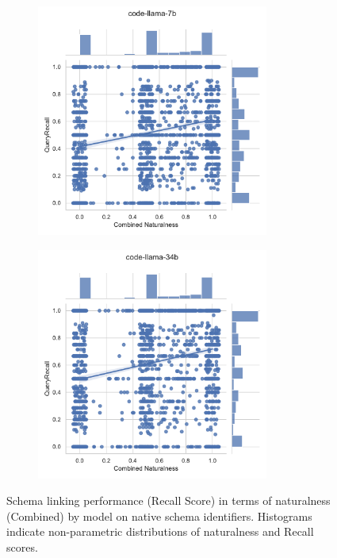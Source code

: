 \begin{figure}
    \begin{subfigure}{.5\textwidth}
      \centering
      \includegraphics[height=3in]{figures/distribution-jointplots/jointplot-code-llama-7b-combined-nat--recall-with-distributions.pdf}
    \end{subfigure}%
    \begin{subfigure}{.5\textwidth}
      \centering
      \includegraphics[height=3in]{figures/distribution-jointplots/jointplot-code-llama-34b-combined-nat--recall-with-distributions.pdf}
    \end{subfigure}
    \caption{Schema linking performance (Recall Score) in terms of naturalness (Combined) by model on native schema identifiers. Histograms indicate non-parametric distributions of naturalness and Recall scores.}
    \label{fig:distribution-jointplot-native-recall}
  \end{figure}
  
